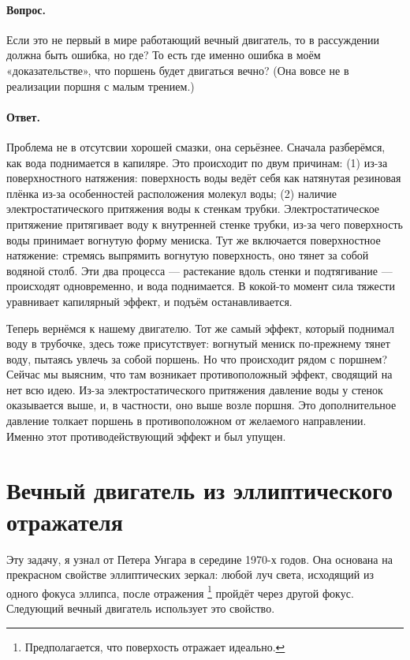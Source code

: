 \paragraph{Вопрос.}
Если это не первый в мире работающий вечный двигатель, то в рассуждении должна быть ошибка, но где?
То есть где именно ошибка в моём «доказательстве», что поршень будет двигаться вечно?
(Она вовсе не в реализации поршня с малым трением.)

\paragraph{Ответ.}
Проблема не в отсутсвии хорошей смазки, она серьёзнее.
Сначала разберёмся, как вода поднимается в капиляре.
Это происходит по двум причинам:
(1) из-за поверхностного натяжения: поверхность воды ведёт себя как натянутая резиновая плёнка из-за особенностей расположения молекул воды;
(2) наличие электростатического притяжения воды к стенкам трубки.
Электростатическое притяжение притягивает воду к внутренней стенке трубки, из-за чего поверхность воды принимает вогнутую форму мениска.
Тут же включается поверхностное натяжение: стремясь выпрямить вогнутую поверхность, оно тянет за собой водяной столб.
Эти два процесса — растекание вдоль стенки и подтягивание — происходят одновременно, и вода поднимается.
В кокой-то момент сила тяжести уравнивает капилярный эффект, и подъём останавливается.

Теперь вернёмся к нашему двигателю.
Тот же самый эффект, который поднимал воду в трубочке, здесь тоже присутствует: вогнутый мениск по-прежнему тянет воду, пытаясь увлечь за собой поршень.
Но что происходит рядом с поршнем?
Сейчас мы выясним, что там возникает противоположный эффект, сводящий на нет всю идею.
Из-за электростатического притяжения давление воды у стенок оказывается выше, и, в частности, оно выше возле поршня.
Это дополнительное давление толкает поршень в противоположном от желаемого направлении.
Именно этот противодействующий эффект и был упущен.

\section{Вечный двигатель из эллиптического отражателя}

Эту задачу, я узнал от Петера Унгара в середине
1970-х годов.
Она основана на прекрасном свойстве эллиптических зеркал:
любой луч света, исходящий из одного фокуса эллипса,
после отражения%
\footnote{Предполагается, что поверхость отражает идеально.}
пройдёт через другой фокус.
Следующий вечный двигатель использует это свойство.

